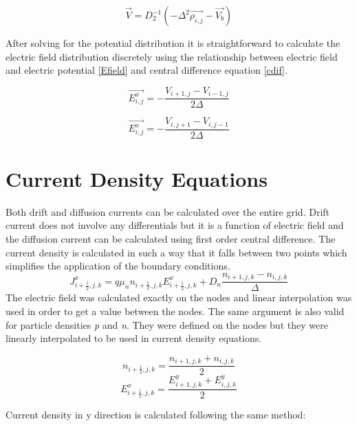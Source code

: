 \begin{doublespace}
\begin{equation}
\vec{V}=D_{2}^{-1}(-\Delta^2\vec{\rho_{i,j}}-\vec{V_b})
\end{equation}

After solving for the potential distribution it is straightforward to calculate the electric field distribution discretely using the relationship between electric field and electric potential \eqref{Efield} and central difference equation \eqref{cdif}. 

\begin{equation}
\vec{E^x_{i,j}}=-\frac{V_{i+1,j}-V_{i-1,j}}{2\Delta}
\end{equation}

\begin{equation}
\vec{E^x_{i,j}}=-\frac{V_{i,j+1}-V_{i,j-1}}{2\Delta}
\end{equation}

\clearpage
\section{Current Density Equations}
 Both drift and diffusion currents can be calculated over the entire grid. Drift current does not involve any differentials but it is a function of electric field and the diffusion current can be calculated using first order central difference\cite{Dragica1}. The current density is calculated in such a way that it falls between two points which simplifies the application of the boundary conditions.
\begin{equation}
J^x_{i+\frac{1}{2},j,k}=q\mu_n n_{i+\frac{1}{2},j,k} E^x_{i+\frac{1}{2},j,k}+D_n \frac{n_{i+1,j,k}-n_{i,j,k}}{\Delta}
\end{equation}
The electric field was calculated exactly on the nodes and linear interpolation was used in order to get a value between the nodes. The same argument is also valid for particle densities \textit{p} and \textit{n}. They were defined on the nodes but they were linearly interpolated to be used in current density equations.

\begin{equation}\nonumber
n_{i+\frac{1}{2},j,k}=\frac{n_{i+1,j,k}+n_{i,j,k}}{2}
\end{equation}
\begin{equation}\nonumber
E^{x}_{i+\frac{1}{2},j,k}=\frac{E^y_{i+1,j,k}+E^y_{i,j,k}}{2}
\end{equation}

Current density in y direction is calculated following the same method:


\end{doublespace}
